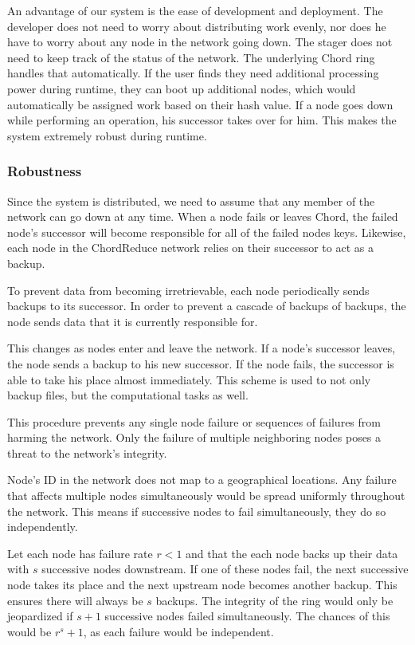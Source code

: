 An advantage of our system is the ease of development and deployment.  
The developer does not need to worry about distributing work evenly, nor does he have to worry about any node in the network going down. 
The stager does not need to keep track of the status of the network.  
The underlying Chord ring handles that automatically.  
If the user finds they need additional processing power during runtime, they can boot up additional nodes, which would automatically be assigned work based on their hash value.   
If a node goes down while performing an operation, his successor takes over for him.  
This makes the system extremely robust during runtime.


\subsubsection{Robustness}
Since the system is distributed, we need to assume that any member of the network can go down at any time.
When a node fails or leaves Chord, the failed node's successor will become responsible for all of the failed nodes keys. 
Likewise, each node in the ChordReduce network relies on their successor to act as a backup.

To prevent data from becoming irretrievable, each node periodically sends backups to its successor.  
In order to prevent a cascade of backups of backups, the node sends data that it is currently responsible for.  

This changes as nodes enter and leave the network.  
If a node's successor leaves, the node sends a backup to his new successor.  
If the node fails, the successor is able to take his place almost immediately.  
This scheme is used to not only backup files, but the computational tasks as well.

This procedure prevents any single node failure or sequences of failures from harming the network. 
Only the failure of multiple neighboring nodes poses a threat to the network's integrity.  

Node's ID in the network does not map to a geographical locations.
Any failure that affects multiple nodes simultaneously would be spread uniformly throughout the network.
This means if successive nodes to fail simultaneously, they do so independently.

Let each node has failure rate $r < 1$ and that the each node backs up their data with $s$ successive nodes downstream. 
If one of these nodes fail, the next successive node takes its place and the next upstream node becomes another backup. 
This ensures there will always be $s$ backups. 
The integrity of the ring would only be jeopardized if $s+1$ successive nodes failed simultaneously.
The chances of this would be $r^s+1$, as each failure would be independent.


